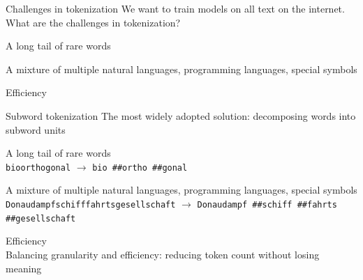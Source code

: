\documentclass[usenames,dvipsnames,notes,11pt,aspectratio=169,hyperref={colorlinks=true, linkcolor=blue}]{beamer}
\begin{document}
\begin{frame}
    {Challenges in tokenization}
    We want to train models on all text on the internet. What are the challenges in tokenization? \pause
    \begin{wideitemize}
        \item A long tail of rare words\\
        \item A mixture of multiple natural languages, programming languages, special symbols\\
        \item Efficiency\\
    \end{wideitemize}
\end{frame}

\begin{frame}
    {Subword tokenization}
    The most widely adopted solution: decomposing words into subword units
    \begin{wideitemize}[<+->]
        \item A long tail of rare words\\
            \texttt{bioorthogonal} $\rightarrow$ {\tt bio \#\#ortho \#\#gonal}
        \item A mixture of multiple natural languages, programming languages, special symbols\\
            \texttt{Donaudampfschifffahrtsgesellschaft} $\rightarrow$ {\tt Donaudampf \#\#schiff \#\#fahrts \#\#gesellschaft} 
        \item Efficiency\\
            Balancing granularity and efficiency: reducing token count without losing meaning
    \end{wideitemize}
\end{frame}
\end{document}
